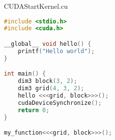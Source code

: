 \begin{codeblock}{CUDAStartKernel.cu}
    \begin{lstlisting}[language = C]
#include <stdio.h>
#include <cuda.h>

__global__ void hello() {
    printf("Hello world");
}

int main() {
    dim3 block(3, 2);
    dim3 grid(4, 3, 2);
    hello <<<grid, block>>>();
    cudaDeviceSynchronize();
    return 0;
}

my_function<<<grid, block>>>();\end{lstlisting}
\end{codeblock}